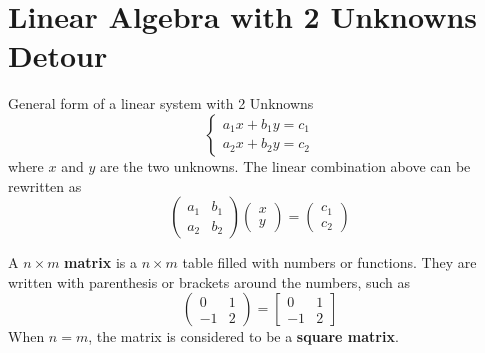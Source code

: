 \documentclass[twoside]{report}
\begin{document}
    \section{Linear Algebra with 2 Unknowns Detour}
    \begin{definition}
        General form of a linear system with 2 Unknowns
        \begin{equation}
            \begin{cases}
                a_{1}x + b_{1}y = c_{1}\\
                a_{2}x + b_{2}y = c_{2}
            \end{cases}
        \end{equation}
        where $x$ and $y$ are the two unknowns.
        The linear combination above can be rewritten as
        \begin{equation}
            \begin{pmatrix}
                a_{1} & b_{1}\\
                a_{2} & b_{2}
            \end{pmatrix}
            \begin{pmatrix}
                x\\ y
            \end{pmatrix}
            =
            \begin{pmatrix}
                c_{1}\\ c_{2}
            \end{pmatrix}
        \end{equation}
    \end{definition}
    \begin{definition}[Matricies]
        A $n \times m$ \textbf{matrix} is a $n \times m$ table filled with numbers or functions. They are written with parenthesis or brackets around the numbers, such as
        \begin{equation}
            \begin{pmatrix}
                0 & 1\\
                -1 & 2
            \end{pmatrix}=
            \begin{bmatrix}
                0 & 1\\
                -1 & 2
            \end{bmatrix}
        \end{equation}
        When $n = m$, the matrix is considered to be a \textbf{square matrix}.
    \end{definition}
\end{document}
